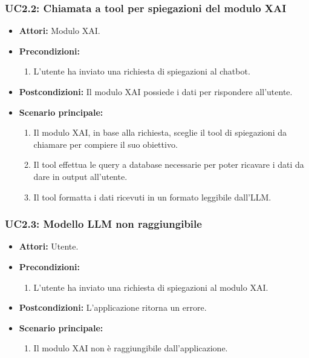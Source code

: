 \subsubsection{UC2.2: Chiamata a tool per spiegazioni del modulo XAI}
    \label{uc:uc2.2}
    \begin{itemize}
        \item \textbf{Attori:} Modulo XAI.
        \item \textbf{Precondizioni:} 
            \begin{enumerate}
                \item L'utente ha inviato una richiesta di spiegazioni al chatbot.
            \end{enumerate}
        \item \textbf{Postcondizioni:} Il modulo XAI possiede i dati per rispondere all'utente.
        \item \textbf{Scenario principale:}
            \begin{enumerate}
                \item Il modulo XAI, in base alla richiesta, sceglie il tool di spiegazioni da chiamare per compiere il suo obiettivo.
                \item Il tool effettua le query a database necessarie per poter ricavare i dati da dare in output all'utente.
                \item Il tool formatta i dati ricevuti in un formato leggibile dall'LLM.
            \end{enumerate}
    \end{itemize}

\subsubsection{UC2.3: Modello LLM non raggiungibile}
    \label{uc:uc2.3}
    \begin{itemize}
        \item \textbf{Attori:} Utente.
        \item \textbf{Precondizioni:} 
            \begin{enumerate}
                \item L'utente ha inviato una richiesta di spiegazioni al modulo XAI.
            \end{enumerate}
        \item \textbf{Postcondizioni:} L'applicazione ritorna un errore.
        \item \textbf{Scenario principale:}
            \begin{enumerate}
                \item Il modulo XAI non è raggiungibile dall'applicazione.
            \end{enumerate}
    \end{itemize}


